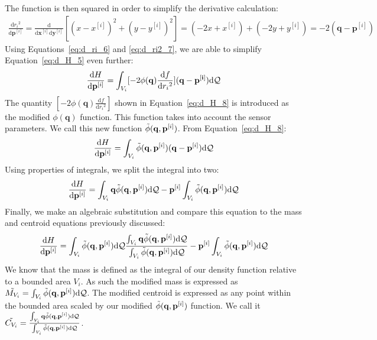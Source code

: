 The function is then squared in order to simplify the derivative calculation:
\begin{align}
    \frac{\mathrm{d}{{r_i}^2}}{\mathrm{d}\mathbf{p}^{[i]}} = \frac{\mathrm{d}}{\mathrm{d}\mathbf{x}^{[i]}\mathrm{d}\mathbf{y}^{[i]}}[(x-{x}^{[i]})^2 + (y-{y}^{[i]})^2] = (-2x+{x}^{[i]}) + (-2y+{y}^{[i]}) = -2(\mathbf{q} - \mathbf{p}^{[i]})
    \label{eq:d_ri2_7}
\end{align}
Using Equations~\eqref{eq:d_ri_6} and \eqref{eq:d_ri2_7}, we are able to simplify Equation~\eqref{eq:d_H_5} even further:
\begin{align}
    \frac{\mathrm{d}H}{\mathrm{d}\mathbf{p}^{[i]}} = \int_{V_i} [-2 \phi(\mathbf{q}) \frac{\mathrm{d}f}{\mathrm{d}{r_i}^2}](\mathbf{q} - \mathbf{p^{[i]}}) \mathrm{d}{\cal Q}
    \label{eq:d_H_8}
\end{align}
The quantity $[-2 \phi(\mathbf{q}) \frac{\mathrm{d}f}{\mathrm{d}{r_i}^2}]$ shown in Equation~\eqref{eq:d_H_8} is introduced as the modified $\phi(\mathbf{q})$ function. This function takes into account the sensor parameters. We call this new function $\Tilde{\phi}(\mathbf{q},\mathbf{p}^{[i]})$. From Equation~\eqref{eq:d_H_8}:
\begin{align}
    \frac{\mathrm{d}H}{\mathrm{d}\mathbf{p}^{[i]}} = \int_{V_i} \Tilde{\phi}(\mathbf{q},\mathbf{p}^{[i]}) (\mathbf{q} - \mathbf{p}^{[i]}) \mathrm{d}{\cal Q}
    \label{eq:d_H_9}
\end{align}
Using properties of integrals, we split the integral into two:
\begin{align}
    \frac{\mathrm{d}H}{\mathrm{d}\mathbf{p}^{[i]}} = \int_{V_i} \mathbf{q} \Tilde{\phi}(\mathbf{q},\mathbf{p}^{[i]}) \mathrm{d}{\cal Q} - \mathbf{p}^{[i]} \int_{V_i} \Tilde{\phi}(\mathbf{q},\mathbf{p}^{[i]}) \mathrm{d}{\cal Q}
    \label{eq:d_H_10}
\end{align}
Finally, we make an algebraic substitution and compare this equation to the mass and centroid equations previously discussed:
\begin{align}
    \frac{\mathrm{d}H}{\mathrm{d}\mathbf{p}^{[i]}} = \int_{V_i} \Tilde{\phi}(\mathbf{q},\mathbf{p}^{[i]}) \mathrm{d}{\cal Q} \frac{\int_{V_i} \mathbf{q} \Tilde{\phi}(\mathbf{q},\mathbf{p}^{[i]}) \mathrm{d}{\cal Q}}{\int_{V_i} \Tilde{\phi}(\mathbf{q},\mathbf{p}^{[i]}) \mathrm{d}{\cal Q}} - \mathbf{p}^{[i]} \int_{V_i} \Tilde{\phi}(\mathbf{q},\mathbf{p}^{[i]}) \mathrm{d}{\cal Q}
    \label{eq:d_H_11}
\end{align}
We know that the mass is defined as the integral of our density function relative to a bounded area $V_i$. As such the modified mass is expressed as $\Tilde{M_{V_i}} =  \int_{V_i} \Tilde{\phi}(\mathbf{q},\mathbf{p}^{[i]}) \mathrm{d}{\cal Q}$. The modified centroid is expressed as any point within the bounded area scaled by our modified $\Tilde{\phi}(\mathbf{q},\mathbf{p}^{[i]})$ function. We call it $\Tilde{C_{V_i}} = \frac{\int_{V_i} \mathbf{q} \Tilde{\phi}(\mathbf{q},\mathbf{p}^{[i]}) \mathrm{d}{\cal Q}}{\int_{V_i} \Tilde{\phi}(\mathbf{q},\mathbf{p}^{[i]}) \mathrm{d}{\cal Q}}$.
